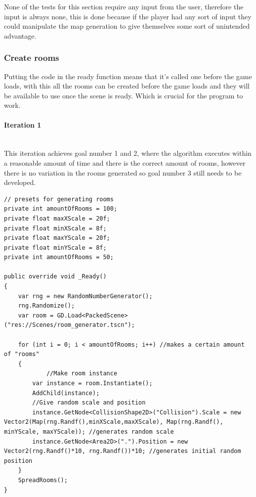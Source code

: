 \documentclass{article}
\newcommand{\parBr}{\vspace{5mm}}%
\newcommand{\myparagraph}[1]{\paragraph{#1}\mbox{}\\} %
\begin{document}
\parBr

None of the tests for this section require any input from the user, therefore the input is always none, this is done because if the player had any sort of input they could manipulate the map generation to give themselves some sort of unintended advantage.
\subsubsection{Create rooms}
Putting the code in the ready function means that it's called one before the game loads, with this all the rooms can be created before the game loads and they will be available to use once the scene is ready. Which is crucial for the program to work.
\myparagraph{Iteration 1}
This iteration achieves goal number 1 and 2, where the algorithm executes within a reasonable amount of time and there is the correct amount of rooms, however there is no variation in the rooms generated so goal number 3 still needs to be developed.
\begin{lstlisting}
// presets for generating rooms
private int amountOfRooms = 100;
private float maxXScale = 20f;
private float minXScale = 8f;
private float maxYScale = 20f;
private float minYScale = 8f;
private int amountOfRooms = 50;

public override void _Ready()
{
    var rng = new RandomNumberGenerator();
    rng.Randomize();
    var room = GD.Load<PackedScene>("res://Scenes/room_generator.tscn");

    for (int i = 0; i < amountOfRooms; i++) //makes a certain amount of "rooms"
    {
    	    //Make room instance
        var instance = room.Instantiate();
        AddChild(instance);
        //Give random scale and position
        instance.GetNode<CollisionShape2D>("Collision").Scale = new Vector2(Map(rng.Randf(),minXScale,maxXScale), Map(rng.Randf(), minYScale, maxYScale)); //generates random scale
        instance.GetNode<Area2D>(".").Position = new Vector2(rng.Randf()*10, rng.Randf())*10; //generates initial random position
    }
    SpreadRooms();
}
\end{lstlisting}
\end{document}
